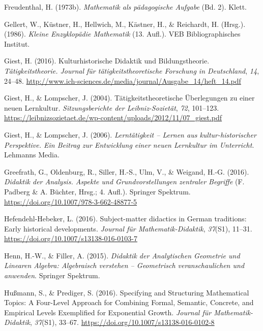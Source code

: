 \documentclass[
]{scrbook}
\newlength{\cslhangindent}
\newenvironment{CSLReferences}[2] %
 {\begin{list}{}{%
  \setlength{\itemindent}{0pt}
  \setlength{\leftmargin}{0pt}
  \setlength{\parsep}{0pt}
  \ifodd #1
   \setlength{\leftmargin}{\cslhangindent}
   \setlength{\itemindent}{-1\cslhangindent}
  \fi
  \setlength{\itemsep}{#2\baselineskip}}}
 {\end{list}}
\theoremstyle{definition}
\theoremstyle{definition}
\theoremstyle{definition}
\theoremstyle{definition}
\theoremstyle{remark}
\begin{document}
\begin{CSLReferences}{1}{0}
Freudenthal, H. (1973b). \emph{Mathematik als pädagogische {Aufgabe}} (Bd. 2). Klett.

Gellert, W., Küstner, H., Hellwich, M., Kästner, H., \& Reichardt, H. (Hrsg.). (1986). \emph{Kleine {Enzyklopädie} {Mathematik}} (13. Aufl.). VEB Bibliographisches Institut.

Giest, H. (2016). Kulturhistorische {Didaktik} und {Bildungstheorie}. \emph{Tätigkeitstheorie. Journal für tätigkeitstheoretische Forschung in Deutschland}, \emph{14}, 24--48. \url{http://www.ich-sciences.de/media/journal/Ausgabe_14/heft_14.pdf}

Giest, H., \& Lompscher, J. (2004). Tätigkeitstheoretische Überlegungen zu einer neuen {Lernkultur}. \emph{Sitzungsberichte der Leibniz-Sozietät}, \emph{72}, 101--123. \url{https://leibnizsozietaet.de/wp-content/uploads/2012/11/07_giest.pdf}

Giest, H., \& Lompscher, J. (2006). \emph{Lerntätigkeit -- {Lernen} aus kultur-historischer {Perspektive}. {Ein} {Beitrag} zur {Entwicklung} einer neuen {Lernkultur} im {Unterricht}}. Lehmanns Media.

Greefrath, G., Oldenburg, R., Siller, H.-S., Ulm, V., \& Weigand, H.-G. (2016). \emph{Didaktik der {Analysis}. {Aspekte} und {Grundvorstellungen} zentraler {Begriffe}} (F. Padberg \& A. Büchter, Hrsg.; 4. Aufl.). Springer Spektrum. \url{https://doi.org/10.1007/978-3-662-48877-5}

Hefendehl-Hebeker, L. (2016). Subject-matter didactics in {German} traditions: {Early} historical developments. \emph{Journal für Mathematik-Didaktik}, \emph{37}(S1), 11--31. \url{https://doi.org/10.1007/s13138-016-0103-7}

Henn, H.-W., \& Filler, A. (2015). \emph{Didaktik der {Analytischen} {Geometrie} und {Linearen} {Algebra}: {Algebraisch} verstehen -- {Geometrisch} veranschaulichen und anwenden}. Springer Spektrum.

Hußmann, S., \& Prediger, S. (2016). Specifying and Structuring Mathematical Topics: A Four-Level Approach for Combining Formal, Semantic, Concrete, and Empirical Levels Exemplified for Exponential Growth. \emph{Journal für Mathematik-Didaktik}, \emph{37}(S1), 33--67. \url{https://doi.org/10.1007/s13138-016-0102-8}


\end{CSLReferences}
\end{document}
